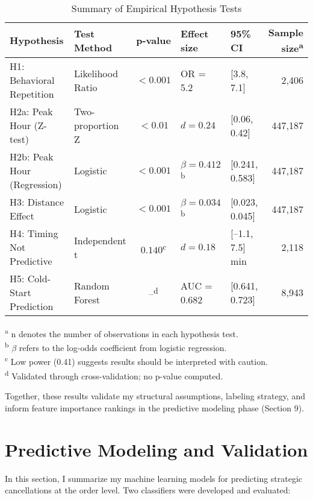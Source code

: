 \documentclass[12pt,letterpaper]{article}
\begin{document}
\begin{table}[H]
\centering
\caption{Summary of Empirical Hypothesis Tests}
\label{tab:hypothesis_summary}
\begin{tabular}{@{}p{3.8cm}p{2.5cm}cp{2.8cm}p{2.5cm}r@{}}
\toprule
\textbf{Hypothesis} & \textbf{Test Method} & \textbf{p-value} & \textbf{Effect size} & \textbf{95\% CI} & \textbf{Sample size}\textsuperscript{a} \\
\midrule
H1: Behavioral Repetition & Likelihood Ratio & $< 0.001$ & OR = 5.2 & [3.8, 7.1] & 2,406 \\
H2a: Peak Hour (Z-test) & Two-proportion Z & $< 0.01$ & $d = 0.24$ & [0.06, 0.42] & 447,187 \\
H2b: Peak Hour (Regression) & Logistic & $< 0.001$ & $\beta = 0.412$\textsuperscript{b} & [0.241, 0.583] & 447,187 \\
H3: Distance Effect & Logistic & $< 0.001$ & $\beta = 0.034$\textsuperscript{b} & [0.023, 0.045] & 447,187 \\
H4: Timing Not Predictive & Independent t & $0.140$\textsuperscript{c} & $d = 0.18$ & [--1.1, 7.5] min & 2,118 \\
H5: Cold-Start Prediction & Random Forest & --\textsuperscript{d} & AUC = 0.682 & [0.641, 0.723] & 8,943 \\
\bottomrule
\end{tabular}
\smallskip
\footnotesize{\textsuperscript{a} n denotes the number of observations in each hypothesis test.\\
\textsuperscript{b} $\beta$ refers to the log-odds coefficient from logistic regression.\\
\textsuperscript{c} Low power (0.41) suggests results should be interpreted with caution.\\
\textsuperscript{d} Validated through cross-validation; no p-value computed.}
\end{table}

Together, these results validate my structural assumptions, labeling strategy, and inform feature importance rankings in the predictive modeling phase (Section 9).

\section{Predictive Modeling and Validation}

In this section, I summarize my machine learning models for predicting strategic cancellations at the order level. Two classifiers were developed and evaluated:
\end{document}
